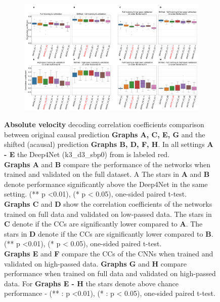 \begin{figure}[!htbp]\ContinuedFloat
\begin{subfigure}[t]{\textwidth}
   \includegraphics[width=1\linewidth]{img/ch4/shifted_vs_non_shifted_absVel_performance_comparison}
   \caption{}
\end{subfigure}\label{fig:shifted-performance-absVel}
\caption[]{{\textbf{Absolute velocity} decoding correlation coefficients comparison between original causal prediction \textbf{Graphs A, C, E, G} and the shifted (acausal) prediction \textbf{Graphs B, D, F, H}. In all settings \textbf{
   A - E} the Deep4Net (k3\_d3\_sbp0) from \cite{Hammer-2021} is labeled red.\\ \textbf{Graphs A} and \textbf{B} compare the performance of the networks when trained and validated on the full dataset. A The stars in \textbf{A} and \textbf{B} denote performance significantly above the Deep4Net in the same setting. (** p <0.01), (* p < 0.05), one-sided paired t-test.
   \\\textbf{Graphs C} and \textbf{D} show the correlation coefficients of the networks trained on full data and validated on low-passed data. 
   The stars in \textbf{C} denote if the CCs are significantly lower compared to \textbf{A}. The stars in \textbf{D} denote if the CCs are significantly lower compared to \textbf{B}. (** p <0.01), (* p < 0.05), one-sided paired t-test.
   \\\textbf{Graphs E} and \textbf{F} compare the CCs of the CNNs when trained and validated on high-passed data. \textbf{Graphs G} and \textbf{H} compare performance when trained on full data and validated on high-passed data. For \textbf{Graphs E - H} the stars denote above chance performance - (** : p <0.01), (* : p < 0.05), one-sided paired t-test.}}
\end{figure}\label{fig:shifted-performance}

